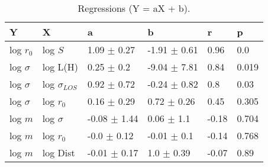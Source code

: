 \begin{table}
\centering
\caption{Regressions (Y = aX + b).}
\begin{tabular}{llllll}
\toprule
            Y &                   X &                 a &                 b &      r &      p \\
\midrule
    log $r_0$ &             log $S$ &   1.09 $\pm$ 0.27 &  -1.91 $\pm$ 0.61 &   0.96 &    0.0 \\
 log $\sigma$ &            log L(H) &    0.25 $\pm$ 0.2 &  -9.04 $\pm$ 7.81 &   0.84 &  0.019 \\
 log $\sigma$ &  log $\sigma_{LOS}$ &   0.92 $\pm$ 0.72 &  -0.24 $\pm$ 0.82 &    0.8 &   0.03 \\
 log $\sigma$ &         log $r_{0}$ &   0.16 $\pm$ 0.29 &   0.72 $\pm$ 0.26 &   0.45 &  0.305 \\
      log $m$ &        log $\sigma$ &  -0.08 $\pm$ 1.44 &    0.06 $\pm$ 1.1 &  -0.18 &  0.704 \\
      log $m$ &         log $r_{0}$ &   -0.0 $\pm$ 0.12 &   -0.01 $\pm$ 0.1 &  -0.14 &  0.768 \\
      log $m$ &            log Dist &  -0.01 $\pm$ 0.17 &    1.0 $\pm$ 0.39 &  -0.07 &   0.89 \\
\bottomrule
\end{tabular}
\end{table}
